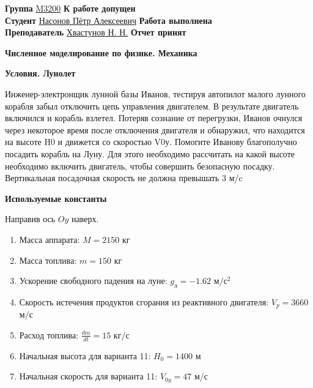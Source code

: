 \documentclass[12pt]{article}
\begin{document}
    \vspace*{2\baselineskip}

    \thispagestyle{fancy}

    \noindent
    \textbf{Группа} \underline{M3200} \hfill \textbf{К работе допущен} \underline{\hspace{4cm}} \\[0.5cm]
    \textbf{Студент} \underline{Насонов Пётр Алексеевич} \hfill \textbf{Работа выполнена} \underline{\hspace{4cm}} \\[0.5cm]
    \textbf{Преподаватель} \underline{Хвастунов Н. Н.} \hfill \textbf{Отчет принят} \underline{\hspace{4.85cm}} \\


    \begin{center}
    {\huge \textbf{Численное моделирование по физике. Механика}}

        \smallvspace

    \end{center}

    \begin{center}
        {\large \textbf{Условия. Лунолет}} \\
    \end{center}

    Инженер-электронщик лунной базы Иванов, тестируя автопилот малого лунного корабля
    забыл отключить цепь управления двигателем. В результате двигатель включился и корабль
    взлетел. Потеряв сознание от перегрузки, Иванов очнулся через некоторое время после
    отключения двигателя и обнаружил, что находится на высоте H0 и движется со скоростью
    V0у.
    Помогите Иванову благополучно посадить корабль на Луну. Для этого необходимо
    рассчитать на какой высоте необходимо включить двигатель, чтобы совершить безопасную
    посадку. Вертикальная посадочная скорость не должна превышать 3 м/c

    \large \textbf{Используемые константы} \normalsize

    Направив ось $Oy$ наверх.

    \normalsize
    \begin{enumerate}
        \item Масса аппарата: $M = 2150$ кг
        \item Масса топлива: $m = 150$ кг
        \item Ускорение свободного падения на луне: $g_{\text{л}} = -1.62$ $\text{м}/\text{с}^2$
        \item Скорость истечения продуктов сгорания из реактивного двигателя: $V_{p} = 3660$ $\text{м}/\text{с}$
        \item Расход топлива: $\frac{dm}{dt} = 15$ $\text{кг}/\text{с}$ 
        \item Начальная высота для варианта 11: $H_0 = 1400$ м
        \item Начальная скорость для варианта 11: $V_{0y} = 47$ м/с
    \end{enumerate}
    
\end{document}
